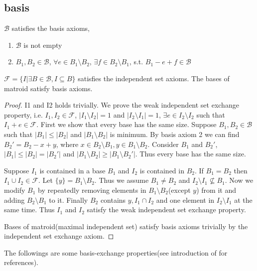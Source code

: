 \documentclass[12pt]{article}
\begin{document}
\subsection{basis}
\begin{theorem}
    $\mathcal B$ satisfies the basis axioms,
    \begin{enumerate}
        \item $\mathcal B$ is not empty
        \item $B_1,B_2\in \mathcal B$, $\forall e\in B_1\setminus B_2$, $\exists f\in B_2\setminus B_1$, s.t. $B_1-e+f\in \mathcal B$
    \end{enumerate}

    $\mathcal F=\{I|\exists B\in \mathcal B, I\subseteq B\}$ satisfies the independent set axioms. The bases of matroid satisfy basis axioms.
\end{theorem}
\begin{proof}
    I1 and I2 holds trivially. We prove the weak independent set exchange property, i.e. $I_1,I_2\in \mathcal F$, $|I_1\setminus I_2|=1$ and $|I_2\setminus I_1|=1$, $\exists e\in I_2\setminus I_2$ such that $I_1+e\in \mathcal F$. 
    First we show that every base has the same size.
    Suppose $B_1,B_2\in \mathcal{B}$ such that $|B_1|\leq |B_2|$ and $|B_1\setminus B_2|$ is minimum. By basis axiom 2 we can find $B_2'=B_2-x+y$, where $x\in B_2\setminus B_1,y\in B_1\setminus B_2$. Consider $B_1$ and $B_2'$, $|B_1|\leq |B_2|=|B_2'|$ and $|B_1\setminus B_2|\geq |B_1\setminus B_2'|$. Thus every base has the same size.
    
    Suppose $I_1$ is contained in a base $B_1$ and $I_2$ is contained in $B_2$. If $B_1=B_2$ then $I_1\cup I_2\in \mathcal F$. Let $\{y\}=B_1\setminus B_2$.
    Thus we assume $B_1\not=B_2$ and $I_2\setminus I_1\not\subseteq B_1$. Now we modify $B_1$ by repeatedly removing elements in $B_1\setminus B_2$(except $y$) from it and adding $B_2\setminus B_1$ to it. Finally $B_2$ contains $y,I_1\cap I_2$ and one element in $I_2\setminus I_1$ at the same time. Thus $I_1$ and $I_2$ satisfy the weak independent set exchange property.

    Bases of matroid(maximal independent set) satisfy basis axioms trivially by the independent set exchange axiom.
\end{proof}

The followings are some basis-exchange properties(see introduction of \cite{Bonin_Savitsky_2016} for references).
\end{document}
